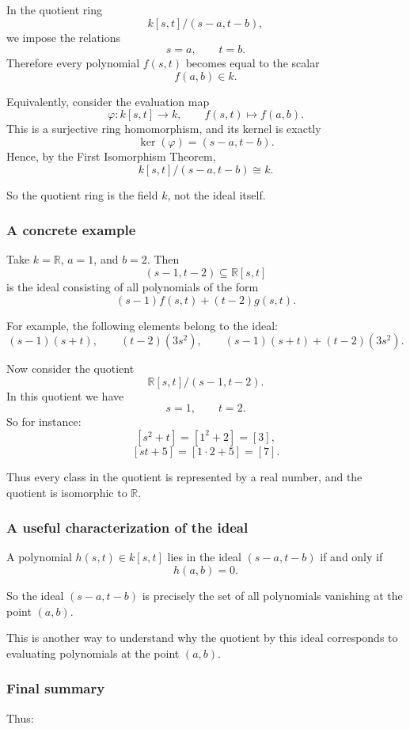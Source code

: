 \documentclass[12pt,a4paper]{article}
\theoremstyle{notespace}
\theoremstyle{definition}
\begin{document}
In the quotient ring
\[
k[s,t]/(s-a,t-b),
\]
we impose the relations
\[
s=a,\qquad t=b.
\]
Therefore every polynomial \(f(s,t)\) becomes equal to the scalar
\[
f(a,b)\in k.
\]

Equivalently, consider the evaluation map
\[
\varphi:k[s,t]\longrightarrow k,
\qquad
f(s,t)\longmapsto f(a,b).
\]
This is a surjective ring homomorphism, and its kernel is exactly
\[
\ker(\varphi)=(s-a,t-b).
\]
Hence, by the First Isomorphism Theorem,
\[
k[s,t]/(s-a,t-b)\cong k.
\]

So the quotient ring is the field \(k\), not the ideal itself.

\subsubsection{A concrete example}

Take \(k=\mathbb{R}\), \(a=1\), and \(b=2\). Then
\[
(s-1,t-2)\subseteq \mathbb{R}[s,t]
\]
is the ideal consisting of all polynomials of the form
\[
(s-1)f(s,t)+(t-2)g(s,t).
\]

For example, the following elements belong to the ideal:
\[
(s-1)(s+t),\qquad (t-2)(3s^2),\qquad (s-1)(s+t)+(t-2)(3s^2).
\]

Now consider the quotient
\[
\mathbb{R}[s,t]/(s-1,t-2).
\]
In this quotient we have
\[
s=1,\qquad t=2.
\]
So for instance:
\[
[s^2+t]=[1^2+2]=[3],
\]
\[
[st+5]=[1\cdot 2+5]=[7].
\]

Thus every class in the quotient is represented by a real number, and the quotient is isomorphic to \(\mathbb{R}\).

\subsubsection{A useful characterization of the ideal}

A polynomial \(h(s,t)\in k[s,t]\) lies in the ideal \((s-a,t-b)\) if and only if
\[
h(a,b)=0.
\]

So the ideal \((s-a,t-b)\) is precisely the set of all polynomials vanishing at the point \((a,b)\).

This is another way to understand why the quotient by this ideal corresponds to evaluating polynomials at the point \((a,b)\).

\subsubsection{Final summary}

Thus:
\end{document}
